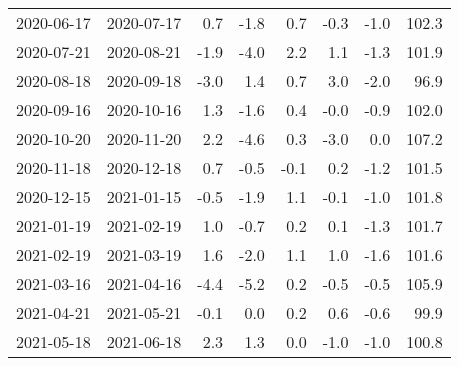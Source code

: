 \begin{tabular}{llrrrrrr}
 2020-06-17 & 2020-07-17 &      0.7 &       -1.8 &        0.7 &      -0.3 &      -1.0 &       102.3 \\
 2020-07-21 & 2020-08-21 &     -1.9 &       -4.0 &        2.2 &       1.1 &      -1.3 &       101.9 \\
 2020-08-18 & 2020-09-18 &     -3.0 &        1.4 &        0.7 &       3.0 &      -2.0 &        96.9 \\
 2020-09-16 & 2020-10-16 &      1.3 &       -1.6 &        0.4 &      -0.0 &      -0.9 &       102.0 \\
 2020-10-20 & 2020-11-20 &      2.2 &       -4.6 &        0.3 &      -3.0 &       0.0 &       107.2 \\
 2020-11-18 & 2020-12-18 &      0.7 &       -0.5 &       -0.1 &       0.2 &      -1.2 &       101.5 \\
 2020-12-15 & 2021-01-15 &     -0.5 &       -1.9 &        1.1 &      -0.1 &      -1.0 &       101.8 \\
 2021-01-19 & 2021-02-19 &      1.0 &       -0.7 &        0.2 &       0.1 &      -1.3 &       101.7 \\
 2021-02-19 & 2021-03-19 &      1.6 &       -2.0 &        1.1 &       1.0 &      -1.6 &       101.6 \\
 2021-03-16 & 2021-04-16 &     -4.4 &       -5.2 &        0.2 &      -0.5 &      -0.5 &       105.9 \\
 2021-04-21 & 2021-05-21 &     -0.1 &        0.0 &        0.2 &       0.6 &      -0.6 &        99.9 \\
 2021-05-18 & 2021-06-18 &      2.3 &        1.3 &        0.0 &      -1.0 &      -1.0 &       100.8 \\
\hline
\end{tabular}